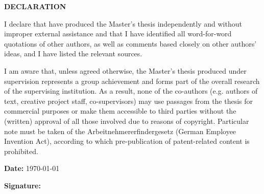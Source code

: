 \newpage
\thispagestyle{empty}


\cleardoublepage
{}
\begin{center}
    \textbf{\large DECLARATION}
\end{center}


I declare that have produced the Master’s thesis \textbf{\thesisTitle} independently and without improper external assistance and that I have identified all
word-for-word quotations of other authors, as well as comments based closely on other authors’ ideas, and I have listed the relevant sources.


I am aware that, unless agreed otherwise, the Master’s thesis  produced under supervision represents a group achievement and forms part of the overall
research of the supervising institution. As a result, none of the co-authors (e.g. authors of text, creative project staff, co-supervisors) may use passages
from the thesis for commercial purposes or make them accessible to third parties without the (written) approval of all those involved due to reasons of copyright.
Particular note must be taken of the Arbeitnehmererfindergesetz (German Employee Invention Act), according to which pre-publication of patent-related content is prohibited.




\vspace*{2cm}
\noindent
\begin{minipage}[t]{0.5\textwidth}
    \textbf{Date:} \today
\end{minipage}%
\begin{minipage}[t]{0.5\textwidth}
    \flushright
    \textbf{Signature:} \underline{\hspace{4cm}}
\end{minipage}
